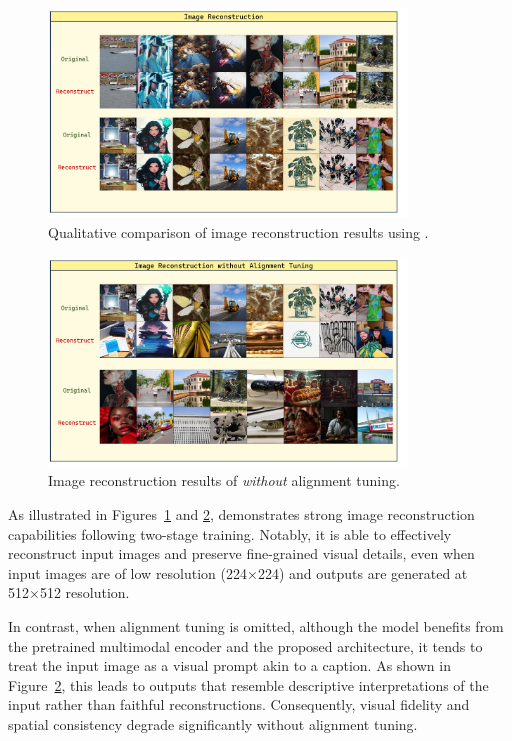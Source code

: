 \begin{figure}[t]
\centering
\includegraphics[width=0.85\textwidth]{figures/reconstrucion.pdf}
\caption{Qualitative comparison of image reconstruction results using \model.}
\label{fig:reconstruction}
\end{figure}

\begin{figure}[t]
\centering
\includegraphics[width=0.85\textwidth]{figures/reconstrucion_wo_alignment.pdf}
\caption{Image reconstruction results of \model \textit{without} alignment tuning.}
\label{fig:reconstruction_wo_align}
\end{figure}

As illustrated in Figures~\ref{fig:reconstruction} and \ref{fig:reconstruction_wo_align}, \model demonstrates strong image reconstruction capabilities following two-stage training. Notably, it is able to effectively reconstruct input images and preserve fine-grained visual details, even when input images are of low resolution (224×224) and outputs are generated at 512×512 resolution.

In contrast, when alignment tuning is omitted, although the model benefits from the pretrained multimodal encoder and the proposed architecture, it tends to treat the input image as a visual prompt akin to a caption. As shown in Figure~\ref{fig:reconstruction_wo_align}, this leads to outputs that resemble descriptive interpretations of the input rather than faithful reconstructions. Consequently, visual fidelity and spatial consistency degrade significantly without alignment tuning.


